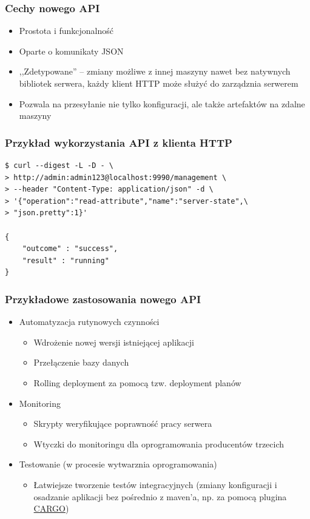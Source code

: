 \documentclass[dvipsnames,table]{beamer}
\begin{document}
\begin{frame}
\frametitle{Cechy nowego API}
\begin{itemize}
	\item Prostota i funkcjonalność
	\item Oparte o komunikaty JSON
	\item ,,Zdetypowane'' -- zmiany możliwe z innej maszyny nawet bez natywnych bibliotek serwera, każdy klient HTTP może służyć do zarządznia serwerem
	\item Pozwala na przesyłanie nie tylko konfiguracji, ale także artefaktów na zdalne maszyny
\end{itemize}
\end{frame}

\begin{frame}[fragile]
\frametitle{Przykład wykorzystania API z klienta HTTP}
\begin{verbatim}
$ curl --digest -L -D - \
> http://admin:admin123@localhost:9990/management \
> --header "Content-Type: application/json" -d \
> '{"operation":"read-attribute","name":"server-state",\
> "json.pretty":1}'

{
    "outcome" : "success",
    "result" : "running"
}
\end{verbatim}
\end{frame}

%

\begin{frame}
\frametitle{Przykładowe zastosowania nowego API}
\begin{itemize}
	\item Automatyzacja rutynowych czynności
	\begin{itemize}
		\item Wdrożenie nowej wersji istniejącej aplikacji
		\item Przełączenie bazy danych
		\item Rolling deployment za pomocą tzw. deployment planów
	\end{itemize}
	\item Monitoring
	\begin{itemize}
		\item Skrypty weryfikujące poprawność pracy serwera
		\item Wtyczki do monitoringu dla oprogramowania producentów trzecich
	\end{itemize}
	\item Testowanie (w procesie wytwarznia oprogramowania)
	\begin{itemize}
		\item Łatwiejsze tworzenie testów integracyjnych (zmiany konfiguracji i osadzanie aplikacji bez pośrednio z maven'a, np. za pomocą plugina \href{http://cargo.codehaus.org/}{CARGO})
	\end{itemize}
\end{itemize}
\end{frame}
\end{document}
